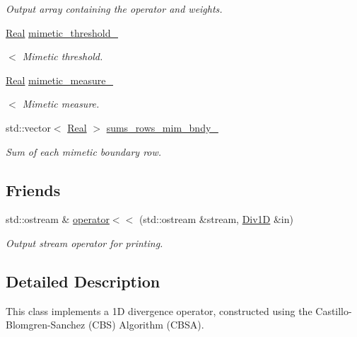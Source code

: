\begin{DoxyCompactItemize}
\begin{DoxyCompactList}\small\item\em Output array containing the operator and weights. \end{DoxyCompactList}\item 
\hyperlink{group__c01-roots_gac080bbbf5cbb5502c9f00405f894857d}{Real} \hyperlink{classmtk_1_1Div1D_a40ed629199b38133f5652b71e8b1cd06}{mimetic\+\_\+threshold\+\_\+}
\begin{DoxyCompactList}\small\item\em $<$ Mimetic threshold. \end{DoxyCompactList}\item 
\hyperlink{group__c01-roots_gac080bbbf5cbb5502c9f00405f894857d}{Real} \hyperlink{classmtk_1_1Div1D_a3163cc1c40588b2e6628b64ebc47413f}{mimetic\+\_\+measure\+\_\+}
\begin{DoxyCompactList}\small\item\em $<$ Mimetic measure. \end{DoxyCompactList}\item 
std\+::vector$<$ \hyperlink{group__c01-roots_gac080bbbf5cbb5502c9f00405f894857d}{Real} $>$ \hyperlink{classmtk_1_1Div1D_aab7f0333d4156efa92e2089295decebc}{sums\+\_\+rows\+\_\+mim\+\_\+bndy\+\_\+}
\begin{DoxyCompactList}\small\item\em Sum of each mimetic boundary row. \end{DoxyCompactList}\end{DoxyCompactItemize}
\subsection*{Friends}
\begin{DoxyCompactItemize}
\item 
std\+::ostream \& \hyperlink{classmtk_1_1Div1D_af3b80aac338975509618e593089e1ed9}{operator$<$$<$} (std\+::ostream \&stream, \hyperlink{classmtk_1_1Div1D}{Div1\+D} \&in)
\begin{DoxyCompactList}\small\item\em Output stream operator for printing. \end{DoxyCompactList}\end{DoxyCompactItemize}


\subsection{Detailed Description}
This class implements a 1\+D divergence operator, constructed using the Castillo-\/\+Blomgren-\/\+Sanchez (C\+B\+S) Algorithm (C\+B\+S\+A). 

